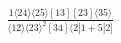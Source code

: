 \documentclass[varwidth, border=5pt]{standalone}
\begin{document}
\begin{my}
$\begin{gathered}
\scriptscriptstyle\frac{1⟨24⟩⟨25⟩[13][23]⟨35⟩}{⟨12⟩⟨23⟩^2[34]⟨2|1+5|2]}
\end{gathered}$
\end{my}
\end{document}
